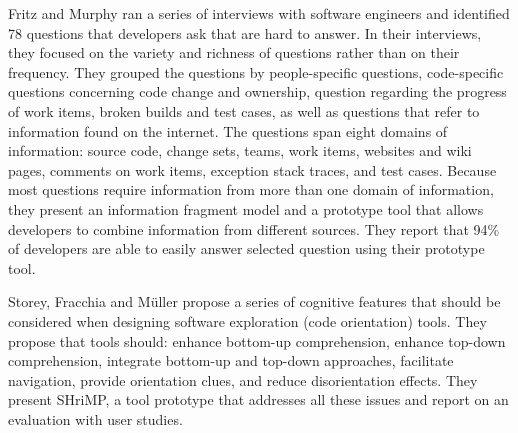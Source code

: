 Fritz and Murphy \cite{Frit10a} ran a series of interviews with software engineers and identified 78 questions that developers ask that are hard to answer. In their interviews, they focused on the variety and richness of questions rather than on their frequency. They grouped the questions by people-specific questions, code-specific questions concerning code change and ownership, question regarding the progress of work items, broken builds and test cases, as well as questions that refer to information found on the internet. 
The questions span eight domains of information: source code, change sets, teams, work items, websites and wiki pages, comments on work items, exception stack traces, and test cases. Because most questions require information from more than one domain of information, they present an information fragment model and a prototype tool that allows developers to combine information from different sources. They report that 94\% of developers are able to easily answer selected question using their prototype tool.

Storey, Fracchia and M\"uller \cite{Stor99a} propose a series of cognitive features that should be considered when designing software exploration (\ie code orientation) tools. They propose that tools should: enhance bottom-up comprehension, enhance top-down comprehension, integrate bottom-up and top-down approaches, facilitate navigation, provide orientation clues, and reduce disorientation effects. They present SHriMP, a tool prototype that addresses all these issues and report on an evaluation with user studies. 

